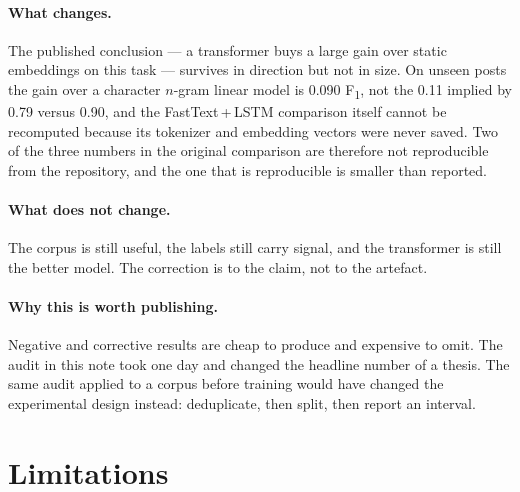 \documentclass[10pt,a4paper]{article}
\newcommand{\fone}{F\textsubscript{1}}
\begin{document}
\paragraph{What changes.}
The published conclusion --- a transformer buys a large gain over static embeddings on this task ---
survives in direction but not in size. On unseen posts the gain over a character $n$-gram linear
model is 0.090 \fone, not the 0.11 implied by 0.79 versus 0.90, and the FastText\,+\,LSTM comparison
itself cannot be recomputed because its tokenizer and embedding vectors were never saved. Two of
the three numbers in the original comparison are therefore not reproducible from the repository,
and the one that is reproducible is smaller than reported.

\paragraph{What does not change.}
The corpus is still useful, the labels still carry signal, and the transformer is still the better
model. The correction is to the claim, not to the artefact.

\paragraph{Why this is worth publishing.}
Negative and corrective results are cheap to produce and expensive to omit. The audit in this note
took one day and changed the headline number of a thesis. The same audit applied to a corpus
before training would have changed the experimental design instead: deduplicate, then split, then
report an interval.

\section{Limitations}
\end{document}
